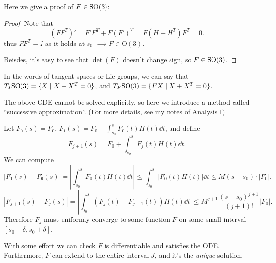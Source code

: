 \begin{remark}
    Here we give a proof of $F\in \mathrm{SO}(3)$:
	\begin{proof}[Proof]
		Note that
		\[
			\left(FF^T\right)' = F'F^T + F(F')^T = F\left(H+H^T\right)F^T = 0.
		\]
		thus $FF^T = I$ as it holds at $s_0$ $ \implies F\in \mathrm{O}(3)$.

		Beisdes, it's easy to see that $\det(F)$ doesn't change sign,
		so  $F\in \mathrm{SO}(3)$.
	\end{proof}

	In the words of tangent spaces or Lie groups, we can say that
	$T_I\mathrm{SO}(3) = \{X\mid X+X^T = 0\}$, and $T_F\mathrm{SO}(3) = \{FX\mid X+X^T = 0\}$.
\end{remark}
\begin{remark}
	The above ODE cannot be solved explicitly, so
    here we introduce a method called ``successive approximation''.
	(For more details, see my notes of Analysis I)

	Let $F_0(s) = F_0$,
	$F_1(s) = F_0 + \int_{s_0}^{s} F_0(t)H(t)\dd t$,
	and define
	\[
		F_{j+1}(s) = F_0 + \int_{s_0}^{s} F_j(t)H(t)\dd t.
	\]
	We can compute
	\[
	|F_1(s)-F_0(s)| = \left|\int_{s_0}^{s} F_0(t)H(t)\dd t\right|
	\le \int_{s_0}^{s} |F_0(t)H(t)|\dd t
	\le M(s-s_0) \cdot |F_0|.
	\]
	\[
	|F_{j+1}(s)-F_{j}(s)| = \left|\int_{s_0}^{s} (F_j(t)-F_{j-1}(t))H(t)\dd t\right|
	\le M^{j+1} \frac{(s-s_0)^{j+1}}{(j+1)!} |F_0|.
	\]
	Therefore $F_j$ must uniformly converge to some function $F$ on
	some small interval $[s_0-\delta, s_0+\delta]$.

	With some effort we can check $F$ is differentiable and satisfies the ODE.
	Furthermore, $F$ can extend to the entire interval $J$, and it's
	the \textit{unique} solution.
\end{remark}

